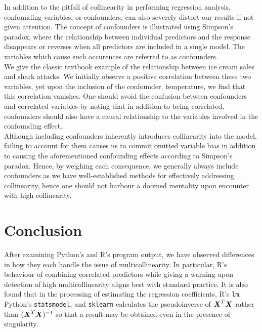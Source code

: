 \documentclass[12pt]{article}
\begin{document}
	In addition to the pitfall of collinearity in performing regression analysis, confounding variables, or confounders, can also severely distort our results if not given attention. The concept of confounders is illustrated using Simpson's paradox, where the relationship between individual predictors and the response disappears or reverses when all predictors are included in a single model. The variables which cause such occurences are referred to as confounders.\\
	
	We give the classic textbook example of the relationship between ice cream sales and shark attacks. We initially observe a positive correlation between these two variables, yet upon the inclusion of the confounder, temperature, we find that this correlation vanishes. One should avoid the confusion between confounders and correlated variables by noting that in addition to being correlated, confounders should also have a causal relationship to the variables involved in the confounding effect.\\
	
	Although including confounders inherently introduces collinearity into the model, failing to account for them causes us to commit omitted variable bias in addition to causing the aforementioned confounding effects according to Simpson's paradox. Hence, by weighing each consequence, we generally always include confounders as we have well-established methods for effectively addressing collinearity, hence one should not harbour a doomed mentality upon encounter with high collinearity.
	
	\section{Conclusion}
	
	After examining Python's and R's program output, we have observed differences in how they each handle the issue of multicollinearity. In particular, R's behaviour of combining correlated predictors while giving a warning upon detection of high multicollinearity aligns best with standard practice. It is also found that in the processing of estimating the regression coefficients, R's \texttt{lm}, Python's \texttt{statsmodel}, and \texttt{sklearn} calculates the pseudoinverse of $\boldsymbol{X}^T\boldsymbol{X}$ rather than $(\boldsymbol{X}^T\boldsymbol{X})^{-1}$ so that a result may be obtained even in the presence of singularity.\\
	
\end{document}
